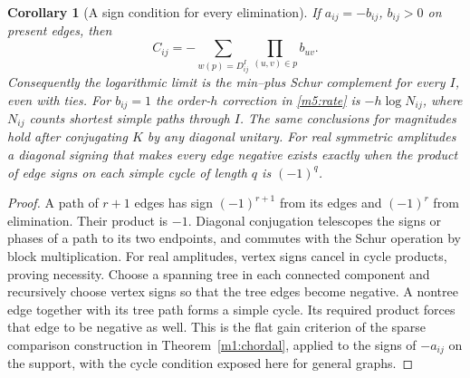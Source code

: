 \documentclass[11pt,reqno]{amsart}
\newtheorem{corollary}[theorem]{Corollary}
\theoremstyle{definition}
\theoremstyle{remark}
\numberwithin{equation}{section}
\begin{document}
\begin{corollary}[A sign condition for every elimination]\label{m5:sign}
If \(a_{ij}=-b_{ij}\), \(b_{ij}>0\) on present edges, then
\[
 C_{ij}=-\sum_{w(p)=D^I_{ij}}\prod_{(u,v)\in p} b_{uv}.
\]
Consequently the logarithmic limit is the min--plus Schur complement for
every \(I\), even with ties. For \(b_{ij}=1\) the order-\(h\) correction in
\eqref{m5:rate} is \(-h\log N_{ij}\), where \(N_{ij}\) counts shortest
simple paths through \(I\). The same conclusions for magnitudes hold
after conjugating \(K\) by any diagonal unitary. For real symmetric
amplitudes a diagonal signing that makes every edge negative exists
exactly when the product of edge signs on each simple cycle of length
\(q\) is \((-1)^q\).
\end{corollary}
\begin{proof}
A path of \(r+1\) edges has sign \((-1)^{r+1}\) from its edges
and \((-1)^r\) from elimination. Their product is \(-1\).
Diagonal conjugation telescopes the signs or phases of a path to its
two endpoints, and commutes with the Schur operation by block
multiplication. For real amplitudes, vertex signs cancel in cycle
products, proving necessity. Choose a spanning tree in each connected
component and recursively choose vertex signs so that the tree edges
become negative. A nontree edge together with its tree path forms a
simple cycle. Its required product forces that edge to be negative as
well. This is the flat gain criterion of the sparse comparison
construction in Theorem~\ref{m1:chordal}, applied to the signs of
\(-a_{ij}\) on the support, with the cycle condition exposed here for
general graphs.
\end{proof}
\end{document}
